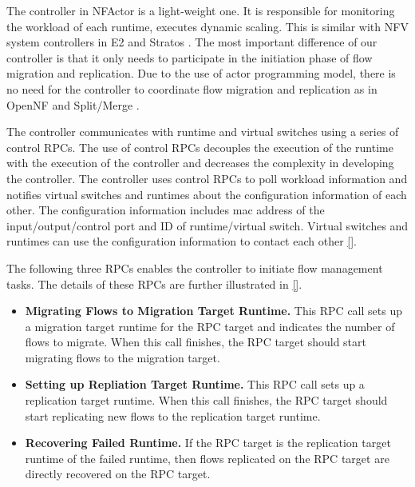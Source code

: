 The controller in NFActor is a light-weight one. It is responsible for monitoring the workload of each runtime, executes dynamic scaling. This is similar with NFV system controllers in E2 \cite{palkar2015e2} and Stratos \cite{gember2012stratos}. The most important difference of our controller is that it only needs to participate in the initiation phase of flow migration and replication. Due to the use of actor programming model, there is no need for the controller to coordinate flow migration and replication as in OpenNF \cite{gember2015opennf} and Split/Merge \cite{rajagopalan2013split}.

The controller communicates with runtime and virtual switches using a series of control RPCs. The use of control RPCs decouples the execution of the runtime with the execution of the controller and decreases the complexity in developing the controller. The controller uses control RPCs to poll workload information and notifies virtual switches and runtimes about the configuration information of each other. The configuration information includes mac address of the input/output/control port and ID of runtime/virtual switch. Virtual switches and runtimes can use the configuration information to contact each other \ref{}.

The following three RPCs enables the controller to initiate flow management tasks. The details of these RPCs are further illustrated in \ref{}.

\begin{itemize}

\item \textbf{Migrating Flows to Migration Target Runtime.} This RPC call sets up a migration target runtime for the RPC target and indicates the number of flows to migrate. When this call finishes, the RPC target should start migrating flows to the migration target.


\item \textbf{Setting up Repliation Target Runtime.} This RPC call sets up a replication target runtime. When this call finishes, the RPC target should start replicating new flows to the replication target runtime.

\item \textbf{Recovering Failed Runtime.} If the RPC target is the replication target runtime of the failed runtime, then flows replicated on the RPC target are directly recovered on the RPC target.

\end{itemize}

